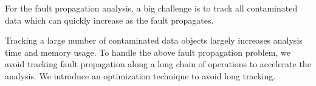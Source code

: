 For the fault propagation analysis, a big challenge is to 
track all contaminated data which can quickly increase as the fault propagates. 
\begin{comment}
We use an example shown in Figure~\ref{fig:fault_propagation_code}
as a running example for the fault propagation analysis. %
This example is from the CG benchmark in SNU\_NPB.
The target data object in this example is the array $r$, and we calculate aDVF for
the assignment operation in the statement $A$. 
If $r[j]$ has a fault at the statement $A$, the fault cannot be masked.
Instead, within the successor four statements (B-E), the fault quickly propagates to four data objects ($rho, d, alpha$ and $z[]$).
\end{comment}
Tracking a large number of contaminated data objects largely increases
analysis time and memory usage. %
To handle the above fault propagation problem, we avoid tracking fault propagation along a long chain of operations
to accelerate the analysis.
We introduce an optimization technique to avoid long tracking.


